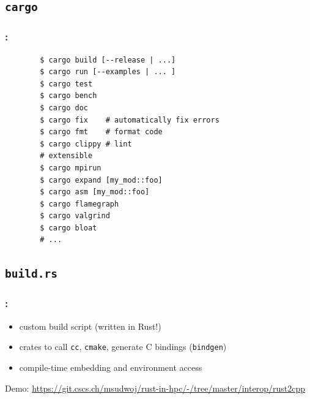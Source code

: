 \documentclass[aspectratio=43, t]{beamer}
\begin{document}
\subsection*{\texorpdfstring{\texttt{cargo}}{cargo}}
\begin{frame}[fragile]
	\frametitle{\secname: \subsecname}

	\begin{verbatim}
		$ cargo build [--release | ...]
		$ cargo run [--examples | ... ]
		$ cargo test
		$ cargo bench
		$ cargo doc
		$ cargo fix    # automatically fix errors
		$ cargo fmt    # format code
		$ cargo clippy # lint
		# extensible
		$ cargo mpirun
		$ cargo expand [my_mod::foo]
		$ cargo asm [my_mod::foo]
		$ cargo flamegraph
		$ cargo valgrind
		$ cargo bloat
		# ...
	\end{verbatim}
\end{frame}

\subsection*{\texorpdfstring{\texttt{build.rs}}{build.rs}}
\begin{frame}
	\frametitle{\secname: \subsecname}

	\begin{itemize}
		\item custom build script (written in Rust!)
		\item crates to call \texttt{cc}, \texttt{cmake}, generate C bindings (\texttt{bindgen})
		\item compile-time embedding and environment access
	\end{itemize}

	Demo: \url{https://git.cscs.ch/msudwoj/rust-in-hpc/-/tree/master/interop/rust2cpp}
\end{frame}
\end{document}
